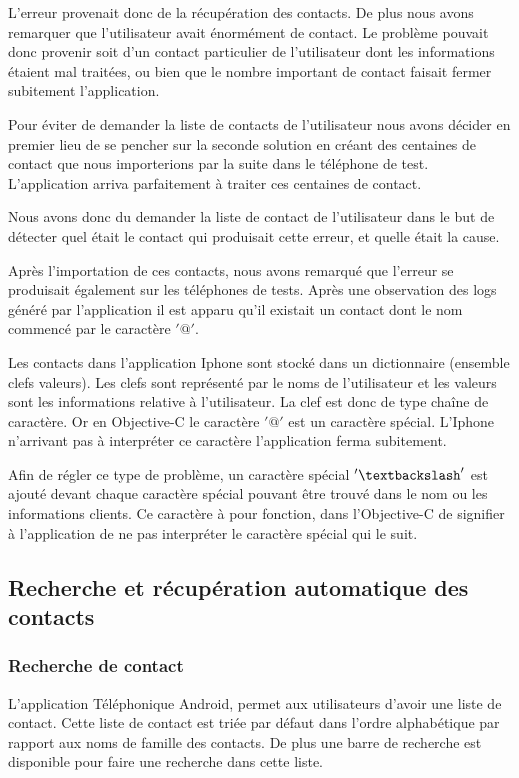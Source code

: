 L'erreur provenait donc de la récupération des contacts. De plus nous avons remarquer que l'utilisateur avait énormément de contact. Le problème pouvait donc provenir soit d'un contact particulier de l'utilisateur dont les informations étaient mal traitées, ou bien que le nombre important de contact faisait fermer subitement l'application.

Pour éviter de demander la liste de contacts de l'utilisateur nous avons décider en premier lieu de se pencher sur la seconde solution en créant des centaines de contact que nous importerions par la suite dans le téléphone de test. L'application arriva parfaitement à traiter ces centaines de contact.

Nous avons donc du demander la liste de contact de l'utilisateur dans le but de détecter quel était le contact qui produisait cette erreur, et quelle était la cause.

Après l'importation de ces contacts, nous avons remarqué que l'erreur se produisait également  sur les téléphones de tests. Après une observation des logs généré par l'application il est apparu qu'il existait un contact dont le nom commencé par le caractère $'@'$.

Les contacts dans l'application Iphone sont stocké dans un dictionnaire (ensemble clefs valeurs). Les clefs sont représenté par le noms de l'utilisateur et les valeurs sont les informations relative à l'utilisateur. La clef est donc de type chaîne de caractère. Or en Objective-C le caractère $'@'$ est un caractère spécial. L'Iphone n'arrivant pas à interpréter ce caractère l'application ferma subitement.

Afin de régler ce type de problème, un caractère spécial $'\textbackslash'$ est ajouté devant chaque caractère spécial pouvant être trouvé dans le nom ou les informations clients. Ce caractère à pour fonction, dans l'Objective-C de signifier à l'application de ne pas interpréter le caractère spécial qui le suit. 

\subsection{Recherche et récupération automatique des contacts}


\subsubsection{Recherche de contact}

L'application Téléphonique Android, permet aux utilisateurs d'avoir une liste de contact. Cette liste de contact est triée par défaut dans l'ordre alphabétique par rapport aux noms de famille des contacts. De plus une barre de recherche est disponible pour faire une recherche dans cette liste.

